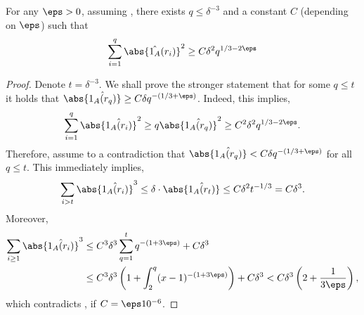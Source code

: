 \documentclass{article}
\begin{document}
\begin{claim}
For any $\eps > 0$, assuming , there exists $q\leq \delta^{-3}$ and a constant $C$ (depending on $\eps$) such that 
\begin{equation}\label{eq:conc}
    \sum_{i=1}^{q}\abs{\hat{1_{A}}(r_i)}^2 \geq  C\delta^2q^{1/3-2\eps}
\end{equation}
\end{claim}
\begin{proof}
Denote $t= \delta^{-3}$. We shall prove the stronger statement that for some $q\leq t$ it holds that $\abs{\hat{1_A(r_q)}} \geq C\delta q^{-(1/3+\eps)}$. Indeed, this implies,
$$\sum_{i=1}^{q}\abs{\hat{1_A(r_i)}}^2 \geq q\abs{\hat{1_A(r_q)}}^2 \geq C^2\delta^2q^{1/3-2\eps}.$$
Therefore, assume to a contradiction that $\abs{\hat{1_A(r_q)}} < C\delta q^{-(1/3+\eps)}$ for all $q\leq t$. This immediately implies,  $$\sum_{i>t}\abs{\hat{1_A(r_i)}}^3 \leq \delta\cdot\abs{\hat{1_A(r_t)}} \leq C\delta^2t^{-1/3} = C\delta^3.$$
Moreover, 
\begin{align*}
    \sum_{i\geq 1}\abs{\hat{1_A(r_i)}}^3 &\leq C^3\delta^3\sum_{q=1}^{t}q^{-(1+3\eps)} + C\delta^3 \\
    &\leq C^3\delta^3\left(1 + \int_{2}^{q}(x-1)^{-(1+3\eps)}\right)+ C\delta^3 < C\delta^3\left(2 + \frac{1}{3\eps}\right),
\end{align*}
which contradicts , if $C = \eps10^{-6}$.
\end{proof}
\end{document}
